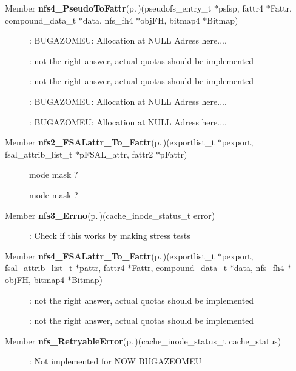 \label{todo__todo000006}
 \begin{description}
\item[Member {\bf nfs4\_\-Pseudo\-To\-Fattr}{\rm (p.\,\pageref{nfs4__pseudo_8c_a18})}(pseudofs\_\-entry\_\-t $\ast$psfsp, fattr4 $\ast$Fattr, compound\_\-data\_\-t $\ast$data, nfs\_\-fh4 $\ast$obj\-FH, bitmap4 $\ast$Bitmap) ]: BUGAZOMEU: Allocation at NULL Adress here.... 

: not the right answer, actual quotas should be implemented 

: not the right answer, actual quotas should be implemented 

: BUGAZOMEU: Allocation at NULL Adress here.... 

: BUGAZOMEU: Allocation at NULL Adress here....\end{description}


\label{todo__todo000009}
 \begin{description}
\item[Member {\bf nfs2\_\-FSALattr\_\-To\_\-Fattr}{\rm (p.\,\pageref{nfs__proto__tools_8c_a9})}(exportlist\_\-t $\ast$pexport, fsal\_\-attrib\_\-list\_\-t $\ast$p\-FSAL\_\-attr, fattr2 $\ast$p\-Fattr) ]mode mask ? 

mode mask ?\end{description}


\label{todo__todo000010}
 \begin{description}
\item[Member {\bf nfs3\_\-Errno}{\rm (p.\,\pageref{nfs__proto__tools_8c_a27})}(cache\_\-inode\_\-status\_\-t error) ]: Check if this works by making stress tests\end{description}


\label{todo__todo000008}
 \begin{description}
\item[Member {\bf nfs4\_\-FSALattr\_\-To\_\-Fattr}{\rm (p.\,\pageref{nfs__proto__tools_8c_a7})}(exportlist\_\-t $\ast$pexport, fsal\_\-attrib\_\-list\_\-t $\ast$pattr, fattr4 $\ast$Fattr, compound\_\-data\_\-t $\ast$data, nfs\_\-fh4 $\ast$obj\-FH, bitmap4 $\ast$Bitmap) ]: not the right answer, actual quotas should be implemented 

: not the right answer, actual quotas should be implemented\end{description}


\label{todo__todo000007}
 \begin{description}
\item[Member {\bf nfs\_\-Retryable\-Error}{\rm (p.\,\pageref{nfs__proto__tools_8c_a5})}(cache\_\-inode\_\-status\_\-t cache\_\-status) ]: Not implemented for NOW BUGAZEOMEU \end{description}
